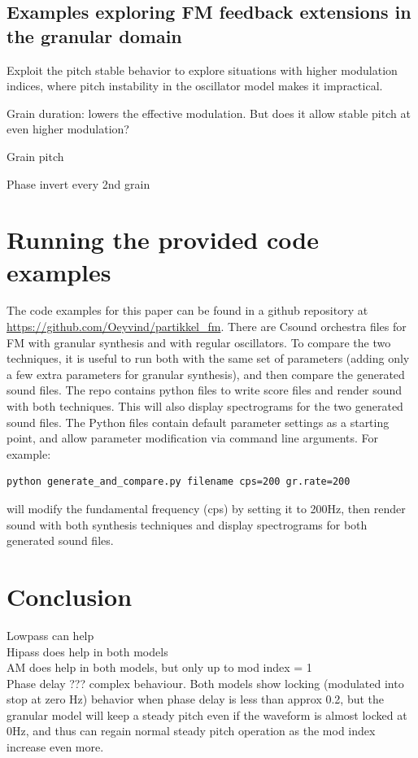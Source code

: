 \documentclass[runningheads,a4paper]{llncs}
\begin{document}
\subsection{Examples exploring FM feedback extensions in the granular domain}
Exploit the pitch stable behavior to explore situations with higher modulation indices, where pitch instability in the oscillator model makes it impractical.

Grain duration: lowers the effective modulation. But does it allow stable pitch at even higher modulation?

Grain pitch

Phase invert every 2nd grain



\section{Running the provided code examples}
The code examples for this paper can be found in a github repository at \url{https://github.com/Oeyvind/partikkel_fm}. There are Csound orchestra files for FM with granular synthesis and with regular oscillators. To compare the two techniques, it is useful to run both with the same set of parameters (adding only a few extra parameters for granular synthesis), and then compare the generated sound files. The repo contains python files to write score files and render sound with both techniques. This will also display spectrograms for the two generated sound files. The Python files contain default parameter settings as a starting point, and allow parameter modification via command line arguments. For example:
\begin{lstlisting}
python generate_and_compare.py filename cps=200 gr.rate=200
\end{lstlisting}
will modify the fundamental frequency (cps) by setting it to 200Hz, then render sound with both synthesis techniques and display spectrograms for both generated sound files. 

\section{Conclusion}

Lowpass can help\\
Hipass does help in both models\\
AM does help in both models, but only up to mod index = 1 \\

Phase delay ??? complex behaviour. Both models show locking (modulated into stop at zero Hz) behavior when phase delay is less than approx 0.2, but the granular model will keep a steady pitch even if the waveform is almost locked at 0Hz, and thus can regain normal steady pitch operation as the mod index increase even more.
\end{document}
